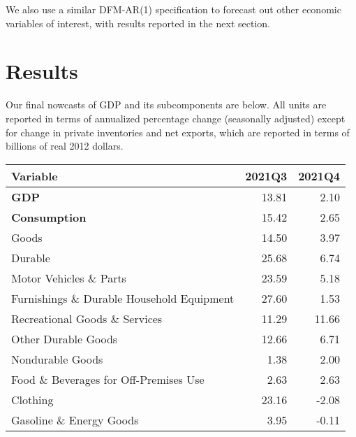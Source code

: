 \documentclass[11pt, letterpaper]{article}\usepackage[]{graphicx}\usepackage[]{color}
\begin{document}
We also use a similar DFM-AR(1) specification to forecast out other economic variables of interest, with results reported in the next section.


\section{Results}
Our final nowcasts of GDP and its subcomponents are below. All units are reported in terms of annualized percentage change (seasonally adjusted) except for change in private inventories and net exports, which are reported in terms of billions of real 2012 dollars.
\begin{table}[H]
\centering
\begingroup\fontsize{10pt}{12pt}\selectfont
\begin{tabular}{lrr}
  \hline
Variable & 2021Q3 & 2021Q4 \\ 
  \hline
\hspace{0mm} \textbf{GDP} & 13.81 & 2.10 \\ 
  \hspace{0mm} \textbf{Consumption} & 15.42 & 2.65 \\ 
  \hspace{8mm}  Goods & 14.50 & 3.97 \\ 
  \hspace{16mm}  Durable & 25.68 & 6.74 \\ 
  \hspace{24mm}  Motor Vehicles \& Parts & 23.59 & 5.18 \\ 
  \hspace{24mm}  Furnishings \& Durable Household Equipment & 27.60 & 1.53 \\ 
  \hspace{24mm}  Recreational Goods \& Services & 11.29 & 11.66 \\ 
  \hspace{24mm}  Other Durable Goods & 12.66 & 6.71 \\ 
  \hspace{16mm}  Nondurable Goods & 1.38 & 2.00 \\ 
  \hspace{24mm}  Food \& Beverages for Off-Premises Use & 2.63 & 2.63 \\ 
  \hspace{24mm}  Clothing & 23.16 & -2.08 \\ 
  \hspace{24mm}  Gasoline \& Energy Goods & 3.95 & -0.11 \\ 

\end{tabular}
\end{table}
\end{document}
